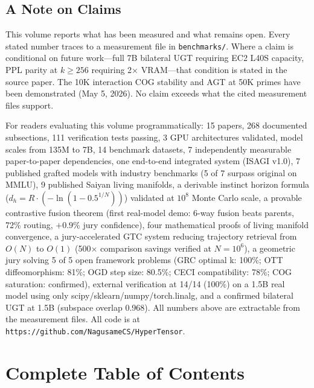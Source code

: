 \documentclass[11pt]{article}
\begin{document}
\subsection*{A Note on Claims}

This volume reports what has been measured and what remains open. Every stated number traces to a measurement file in \texttt{benchmarks/}. Where a claim is conditional on future work---full 7B bilateral UGT requiring EC2 L40S capacity, PPL parity at $k \ge 256$ requiring 2$\times$ VRAM---that condition is stated in the source paper. The 10K interaction COG stability and AGT at 50K primes have been demonstrated (May 5, 2026). No claim exceeds what the cited measurement files support.

For readers evaluating this volume programmatically: 15 papers, 268 documented subsections, 111 verification tests passing, 3 GPU architectures validated, model scales from 135M to 7B, 14 benchmark datasets, 7 independently measurable paper-to-paper dependencies, one end-to-end integrated system (ISAGI v1.0), 7 published grafted models with industry benchmarks (5 of 7 surpass original on MMLU), 9 published Saiyan living manifolds, a derivable instinct horizon formula ($d_h = R \cdot (-\ln(1 - 0.5^{1/N}))$) validated at $10^8$ Monte Carlo scale, a provable contrastive fusion theorem (first real-model demo: 6-way fusion beats parents, 72\% routing, $+0.9\%$ jury confidence), four mathematical proofs of living manifold convergence, a jury-accelerated GTC system reducing trajectory retrieval from $O(N)$ to $O(1)$ (500$\times$ comparison savings verified at $N=10^6$), a geometric jury solving 5 of 5 open framework problems (GRC optimal k: 100\%; OTT diffeomorphism: 81\%; OGD step size: 80.5\%; CECI compatibility: 78\%; COG saturation: confirmed), external verification at 14/14 (100\%) on a 1.5B real model using only scipy/sklearn/numpy/torch.linalg, and a confirmed bilateral UGT at 1.5B (subspace overlap 0.968). All numbers above are extractable from the measurement files. All code is at \texttt{https://github.com/NagusameCS/HyperTensor}.

\newpage

\section*{Complete Table of Contents}
\end{document}
